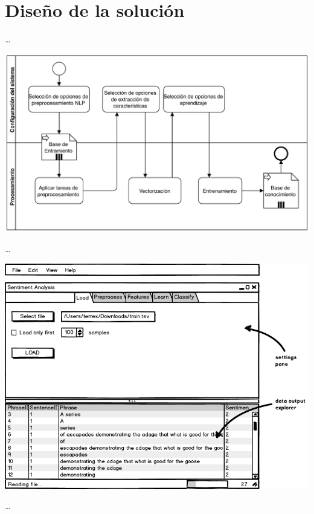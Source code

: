 
\chapter{Diseño de la solución}

\resizebox{0.5\textwidth}{!}{}

\ldots

\includegraphics[width=\textwidth]{bpmn-entrenamiento}

\ldots

\includegraphics[width=14cm]{gui-1-load}

\ldots


